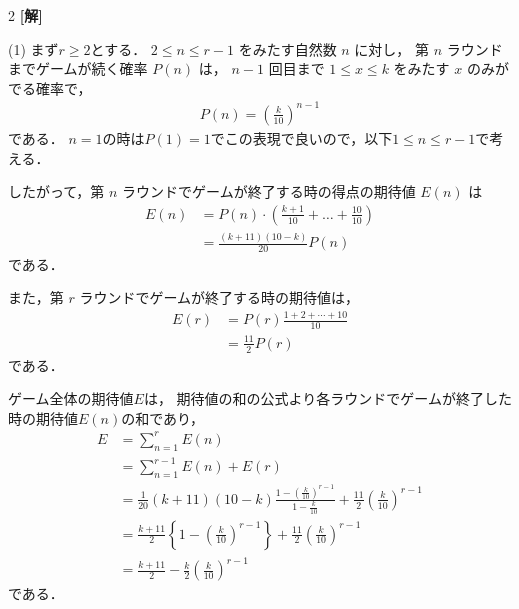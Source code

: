 \documentclass[../../../../main.tex]{subfiles}
\begin{document}
\setcounter{equation}{0}
\begin{oframed}
  
\end{oframed}
\setlength{\columnseprule}{0.4pt}
\begin{multicols}{2}
  {\bf[解]}

  (1)
  まず$r \ge 2$とする．
  $2 \le n \le r-1$ をみたす自然数 $n$ に対し，
  第 $n$ ラウンドまでゲームが続く確率 $P(n)$ は，
  $n-1$ 回目まで $1 \le x \le k$ をみたす $x$ のみがでる確率で，
  \begin{align*}
    P(n) = \left(\frac{k}{10}\right)^{n-1}
  \end{align*}
  である．
  $n=1$の時は$P(1)=1$でこの表現で良いので，以下$1 \le n \le r-1$で考える．

  したがって，第 $n$ ラウンドでゲームが終了する時の得点の期待値 $E(n)$ は
  \begin{align}
    E(n)
     & = P(n) \cdot \left(\frac{k+1}{10} + \dots + \frac{10}{10}\right) \\
     & = \frac{(k+11)(10-k)}{20} P(n) \label{2005-2:eq:2}
  \end{align}
  である．

  また，第 $r$ ラウンドでゲームが終了する時の期待値は，
  \begin{align*}
    E(r)
     & = P(r)\frac{1+2+\cdots+10}{10} \\
     & = \frac{11}{2}P(r)
  \end{align*}
  である．

  ゲーム全体の期待値$E$は，
  期待値の和の公式より各ラウンドでゲームが終了した時の期待値$E(n)$の和であり，
  \begin{align}
    E
     & = \sum_{n=1}^{r} E(n)                                                                                                               \\
     & = \sum_{n=1}^{r-1} E(n) + E(r)                                                                                                      \\
     & = \frac{1}{20} (k+11)(10-k) \frac{1-\left(\frac{k}{10}\right)^{r-1}}{1-\frac{k}{10}} + \frac{11}{2} \left(\frac{k}{10}\right)^{r-1} \\
     & = \frac{k+11}{2} \left\{ 1-\left(\frac{k}{10}\right)^{r-1} \right\} + \frac{11}{2} \left(\frac{k}{10}\right)^{r-1}                  \\
     & = \frac{k+11}{2} - \frac{k}{2} \left(\frac{k}{10}\right)^{r-1} \label{2005-2:eq:1}
  \end{align}
  である．


\end{multicols}
\end{document}
